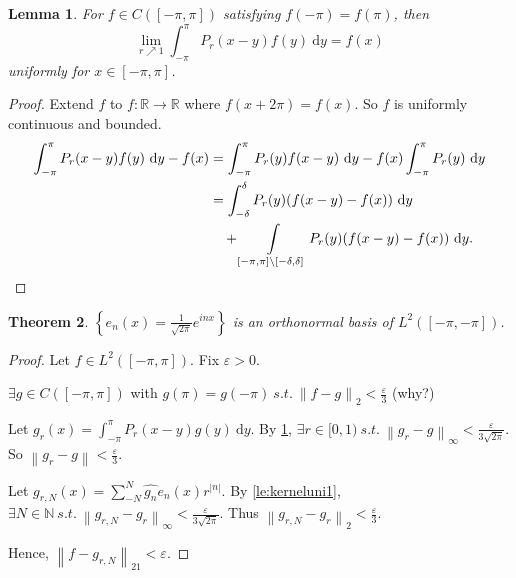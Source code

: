 \documentclass{report}
\newcommand{\R}{\mathbb{R}}
\newcommand{\N}{\mathbb{N}}
\newcommand{\st}{\ s.t.\ }
\newcommand{\df}{\ \mathrm{d}}
\newcommand{\norm}[1]{\left\| #1 \right\|}
\newtheorem{theorem}{Theorem}[chapter]
\newtheorem{lemma}[theorem]{Lemma}
\theoremstyle{definition}
\theoremstyle{remark}
\begin{document}
\begin{lemma}\label{le:kerneluni2}
	For $f \in C([-\pi, \pi])$ satisfying $f(-\pi) = f(\pi)$, then \[
		\lim_{r \nearrow 1} \int_{-\pi}^\pi P_r(x - y)f(y) \df y = f(x)
	\] uniformly for $x \in [-\pi, \pi]$.
\end{lemma}
\begin{proof}
	Extend $f$ to $f: \R \to \R$ where $f(x + 2\pi) = f(x)$. So $f$ is uniformly continuous and bounded.
	\begin{align*}
		\int_{-\pi}^\pi P_r(x - y)f(y) \df y - f(x)	& = \int_{-\pi}^\pi P_r(y)f(x - y)\df y - f(x)\int_{-\pi}^\pi P_r(y) \df y \\
		& = \int_{-\delta}^\delta P_r(y) (f(x - y) - f(x)) \df y \\
		& \quad + \int\limits_{[-\pi, \pi] \setminus [-\delta, \delta]} P_r(y)(f(x - y) - f(x)) \df y. \qedhere
	\end{align*}
\end{proof}


\begin{theorem}
	$\displaystyle \left\{e_n(x) = \frac{1}{\sqrt{2\pi}}e^{inx}\right\}$ is an orthonormal basis of $L^2([-\pi, -\pi])$.
\end{theorem}
\begin{proof}
	Let $f \in L^2([-\pi, \pi])$. Fix $\varepsilon > 0$.

	$\exists g \in C([-\pi, \pi])$ with $g(\pi) = g(-\pi) \st \norm{f - g}_2 < \frac{\varepsilon}{3}$ (why?)
	
	Let $g_r(x) = \int_{-\pi}^\pi P_r(x - y)g(y) \df y$. By \ref{le:kerneluni2}, $\exists r \in [0, 1) \st \norm{g_r - g}_\infty < \frac{\varepsilon}{3\sqrt{2\pi}}$. So $\norm{g_r - g} < \frac{\varepsilon}{3}$.

	Let $g_{r, N}(x) = \sum_{-N}^N \hat{g_n}e_n(x)r^{|n|}$. By \ref{le:kerneluni1}, $\exists N \in \N \st \norm{g_{r, N} - g_r}_\infty < \frac{\varepsilon}{3\sqrt{2\pi}}$. Thus $\norm{g_{r, N} - g_r}_2 < \frac{\varepsilon}{3}$.

	Hence, $\norm{f - g_{r, N}}_21 < \varepsilon$.
\end{proof}
\end{document}
